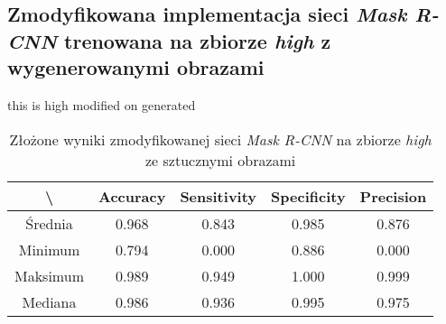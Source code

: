 \subsection{Zmodyfikowana implementacja sieci \textit{Mask R-CNN} trenowana na zbiorze \textit{high} z wygenerowanymi obrazami}
this is high modified on generated

\begin{table}[H]
	\centering
	\caption{Złożone wyniki zmodyfikowanej sieci \textit{Mask R-CNN} na zbiorze \textit{high} ze sztucznymi obrazami}
	\vspace{6pt}
	{\footnotesize
		\begin{tabular}{|c|c|c|c|c|}
      \hline \textbackslash & Accuracy & Sensitivity & Specificity & Precision \\
      \hline Średnia & 0.968 & 0.843 & 0.985 & 0.876 \\
      \hline Minimum & 0.794 & 0.000 & 0.886 & 0.000 \\
      \hline Maksimum & 0.989 & 0.949 & 1.000 & 0.999 \\
      \hline Mediana & 0.986 & 0.936 & 0.995 & 0.975 \\
      \hline
		\end{tabular}
	}
  \vspace{0pt}
  \label{Tab:high_modified_generated_calculated}
\end{table}

